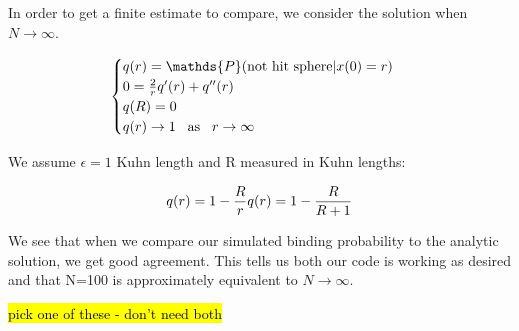 \documentclass[../AdvancementSummary.tex]{subfiles}
\begin{document}
In order to get a finite estimate to compare, we consider the solution when $N\rightarrow \infty$.

 \begin{equation}\label{eq: analytic}
  	\begin{cases}
 	q(r)=\mathds{P}(\text{not hit sphere}|x(0)=r) \\
 	0=\frac{2}{r}q'(r)+q''(r) \\
 	q(R) = 0 \\
 	q(r) \rightarrow 1 \hspace{3mm}\text{as}\hspace{3mm} r \rightarrow \infty \\
 	\end{cases}
 \end{equation}

 We assume $\epsilon = 1$ Kuhn length and R measured in Kuhn lengths:

 \begin{equation}\label{eq: analyticSolution}
q(r) = 1-\frac{R}{r}\\
q(r) = 1-\frac{R}{R+1} \\
 \end{equation}
 
 We see that when we compare our simulated binding probability to the analytic solution, we get good agreement. This tells us both our code is working as desired and that N=100 is approximately equivalent to $N \rightarrow \infty$.

\hl{pick one of these - don't need both}
\end{document}
